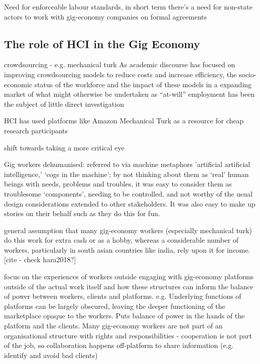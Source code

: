 Need for enforceable labour standards, in short term there's a need for non-state actors to work with gig-economy companies on formal agreements \cite{Minter2017}




\subsection{The role of HCI in the Gig Economy }

crowdsourcing - e.g. mechanical turk
As academic discourse has focused on improving crowdsourcing models to reduce costs and increase efficiency, the socio-economic status of the workforce and the impact of these models in a expanding market of what might otherwise be undertaken as “at-will” employment has been the subject of little direct investigation \cite{Jacques2019}

HCI has used platforms like Amazon Mechanical Turk as a resource for cheap research participants \cite{mason2012conducting, mcnaney2016, Othman2017}

shift towards taking a more critical eye

Gig workers dehumanised: referred to via machine metaphors 'artificial artificial intelligence,’ ‘cogs in the machine'; by not thinking about them as ‘real’ human beings with needs, problems and troubles, it was easy to consider them as troublesome ‘components’, needing to be controlled, and not worthy of the usual design considerations extended to other stakeholders. It was also easy to make up stories on their behalf such as they do this for fun. \cite{martin2016}

general assumption that many gig-economy workers (especially mechanical turk) do this work for extra cash or as a hobby, whereas a considerable number of workers, particularly in south asian countries like india, rely upon it for income. [cite - check hara2018?]


focus on the experiences of workers outside engaging with gig-economy platforms outside of the actual work itself and how these structures can inform the balance of power between workers, clients and platforms. e.g. Underlying functions of platforms can be largely obscured, leaving the deeper functioning of the marketplace opaque to the workers. Puts balance of power in the hands of the platform and the clients.  Many gig-economy workers are not part of an organisational structure with rights and responsibilities - cooperation is not part of the job, so collaboration happens off-platform to share information (e.g. identify and avoid bad clients)  \cite{martin2016} \cite{lee2015}

